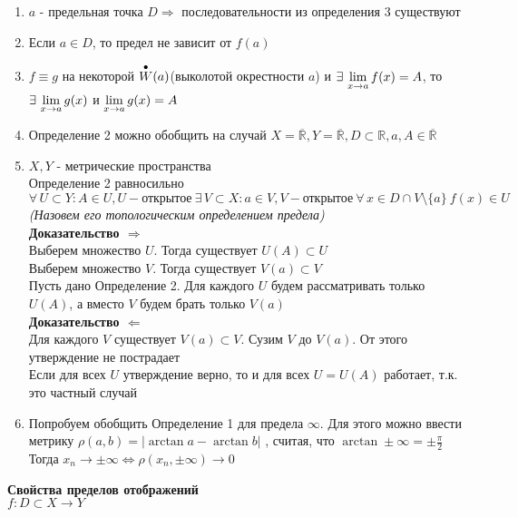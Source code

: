 \documentclass[12pt]{article}
\begin{document}
\begin{enumerate}
    \item $a$ - предельная точка $D\Rightarrow$ последовательности из определения 3 существуют
    \item Если $a \in D$, то предел не зависит от $f(a)$
    \item $f\equiv g$ на некоторой $\overset{\bullet}{W}(a)$(выколотой окрестности $a$) и $\exists\,\lim\limits_{x\rightarrow a} f(x)=A$, то $\exists\,\lim\limits_{x\rightarrow a} g(x)$ и $\lim\limits_{x\rightarrow a} g(x) = A$
    \item Определение 2 можно обобщить на случай $X=\overline{\mathbb{R}}, Y = \overline{\mathbb{R}}, D \subset \mathbb{R}, a, A \in \overline{\mathbb{R}}$
    \item $X,Y$ - метрические пространства\\
    Определение 2 равносильно \\
    $\forall\,U\subset Y: A \in U, U - \text{открытое}\ \exists\,V\subset X: a \in V, V -\text{открытое}\ \forall\,x\in D\cap V \setminus \{a\}\ f(x)\in U$\\
    \textit{(Назовем его топологическим определением предела)}\\
    \textbf{Доказательство $\Rightarrow$}\\
    Выберем множество $U$. Тогда существует $U(A) \subset U$\\
    Выберем множество $V$. Тогда существует $V(a) \subset V$\\
    Пусть дано Определение 2. Для каждого $U$ будем рассматривать только $U(A)$, а вместо $V$ будем брать только $V(a)$\\
    \textbf{Доказательство $\Leftarrow$}\\
    Для каждого $V$ существует $V(a) \subset V$. Сузим $V$ до $V(a)$. От этого утверждение не пострадает\\
    Если для всех $U$ утверждение верно, то и для всех $U=U(A)$ работает, т.к. это частный случай
    \item Попробуем обобщить Определение 1 для предела $\infty$. Для этого можно ввести метрику $\rho(a,b)=|\arctan a - \arctan b|$ , считая, что $\arctan \pm\infty = \pm\frac \pi2$\\
    Тогда $x_n\rightarrow \pm\infty \Leftrightarrow \rho(x_n, \pm\infty) \rightarrow 0$
\end{enumerate}
\textbf{Свойства пределов отображений}\\
$f: D\subset X \rightarrow Y$
\end{document}
